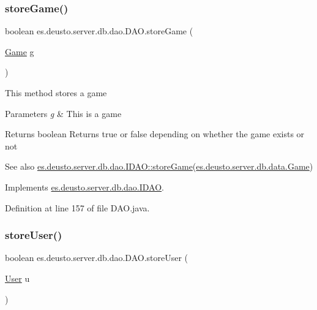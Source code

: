 \subsubsection{\texorpdfstring{store\+Game()}{storeGame()}}
{\footnotesize\ttfamily boolean es.\+deusto.\+server.\+db.\+dao.\+D\+A\+O.\+store\+Game (\begin{DoxyParamCaption}\item[{\hyperlink{classes_1_1deusto_1_1server_1_1db_1_1data_1_1_game}{Game}}]{g }\end{DoxyParamCaption})}

This method stores a game 
\begin{DoxyParams}{Parameters}
{\em g} & This is a game \\
\hline
\end{DoxyParams}
\begin{DoxyReturn}{Returns}
boolean Returns true or false depending on whether the game exists or not 
\end{DoxyReturn}
\begin{DoxySeeAlso}{See also}
\hyperlink{interfacees_1_1deusto_1_1server_1_1db_1_1dao_1_1_i_d_a_o_ab38972c7c70c95b4c409fa7758ef2fc3}{es.\+deusto.\+server.\+db.\+dao.\+I\+D\+A\+O\+::store\+Game}(\hyperlink{classes_1_1deusto_1_1server_1_1db_1_1data_1_1_game}{es.\+deusto.\+server.\+db.\+data.\+Game}) 
\end{DoxySeeAlso}


Implements \hyperlink{interfacees_1_1deusto_1_1server_1_1db_1_1dao_1_1_i_d_a_o_ab38972c7c70c95b4c409fa7758ef2fc3}{es.\+deusto.\+server.\+db.\+dao.\+I\+D\+AO}.



Definition at line 157 of file D\+A\+O.\+java.

\mbox{\label{classes_1_1deusto_1_1server_1_1db_1_1dao_1_1_d_a_o_acb146e96959c340ef828ef8e36b4283c}} 
\subsubsection{\texorpdfstring{store\+User()}{storeUser()}}
{\footnotesize\ttfamily boolean es.\+deusto.\+server.\+db.\+dao.\+D\+A\+O.\+store\+User (\begin{DoxyParamCaption}\item[{\hyperlink{classes_1_1deusto_1_1server_1_1db_1_1data_1_1_user}{User}}]{u }\end{DoxyParamCaption})}

